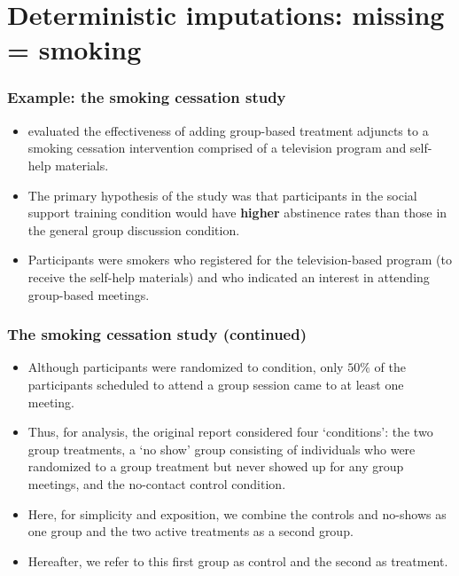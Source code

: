 \documentclass{beamer}
\begin{document}
\section{Deterministic imputations: missing = smoking}
\begin{frame}
\frametitle{Example: the smoking cessation study \citep{gruder1993effects}}
\begin{itemize}
\item \citet{gruder1993effects} evaluated the effectiveness of adding group-based treatment adjuncts to a smoking cessation intervention comprised of a television program and self-help materials. 
\vspace{10pt}
\item The primary hypothesis of the study was that participants in the social support training condition would have {\bf higher} abstinence rates than those in the general group discussion condition.
\vspace{10pt}
\item Participants were smokers who registered for the television-based program (to receive the self-help materials) and who indicated an interest in attending group-based meetings.
\end{itemize}
\end{frame}
\begin{frame}
\frametitle{The smoking cessation study (continued)}
\begin{itemize}
\item Although participants were randomized to condition, only $50\%$ of the participants scheduled to attend a group session came to at least one meeting. 
\vspace{10pt}
\item Thus, for analysis, the original report considered four ‘conditions’: the two group treatments, a ‘no show’ group consisting of individuals who were randomized to a group treatment but never showed up for any group meetings, and the no-contact control condition.
\vspace{10pt}
\item Here, for simplicity and exposition, we combine the controls and no-shows as one group and the two active treatments as a second group. 
\vspace{10pt}
\item Hereafter, we refer to this first group as control and the second as treatment.
\end{itemize}
\end{frame}
\end{document}
